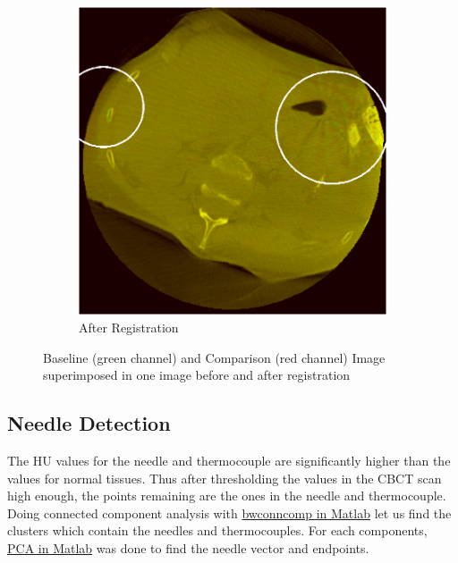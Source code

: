 \documentclass[]{spie}  %
\begin{document}
\begin{figure}
\begin{subfigure}[t]{0.45\textwidth}
\includegraphics[width=\textwidth]{registeredSlice.png} 
\caption{After Registration} \label{regSlice} 
\end{subfigure} 
\caption{Baseline (green channel) and Comparison (red channel) Image superimposed in one image before and after registration}
\label{beforeAndAfterReg} 

\end{figure}

\subsection{Needle Detection}

The HU values for the needle and thermocouple are significantly higher than the values for normal tissues. Thus after thresholding the values in the CBCT scan high enough, the points remaining are the ones in the needle and thermocouple. Doing connected component analysis with \href{http://www.mathworks.com/help/images/ref/bwconncomp.html}{bwconncomp in Matlab} \cite{bwconncomp} let us find the clusters which contain the needles and thermocouples. For each components, \href{http://www.mathworks.com/help/stats/pca.html}{PCA in Matlab} \cite{pca} was done to find the needle vector and endpoints. 
\end{document}
